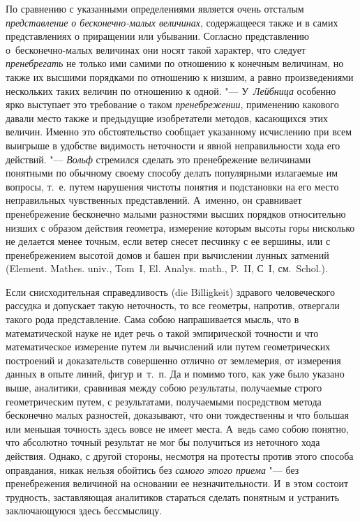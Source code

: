 По сравнению с указанными определениями является очень отсталым
{\em представление о бесконечно-малых величинах}, содержащееся также и в самих
представлениях о приращении или убывании. Согласно представлению
о~бесконечно-малых величинах они носят такой характер, что следует
{\em пренебрегать} не только ими самими по отношению к конечным величинам, но
также их высшими порядками по отношению к низшим, а равно произведениями
нескольких таких величин по отношению к одной. "--- У~{\em Лейбница} особенно
ярко выступает это требование о таком {\em пренебрежении}, применению какового
давали место также и предыдущие изобретатели методов, касающихся этих величин.
Именно это обстоятельство сообщает указанному исчислению при всем выигрыше в
удобстве видимость неточности и явной неправильности хода его действий. "---
{\em Вольф} стремился сделать это пренебрежение величинами понятными по
обычному своему способу делать популярными излагаемые им вопросы, т.~е. путем
нарушения чистоты понятия и подстановки на его место неправильных чувственных
представлений. А~именно, он сравнивает пренебрежение бесконечно малыми
разностями высших порядков относительно низших с образом действия геометра,
измерение которым высоты горы нисколько не делается менее точным, если ветер
снесет песчинку с ее вершины, или с пренебрежением высотой домов и башен при
вычислении лунных затмений (Ele\-ment. Mathes. univ., Tom~I, El. Ana\-lys.
math., P.~II, С~I, см.~Schol.).

Если снисходительная справедливость (die Billigkeit) здравого человеческого
рассудка и допускает такую неточность, то все геометры, напротив, отвергали
такого рода представление. Сама собою напрашивается мысль, что в математической
науке не идет речь о такой эмпирической точности и что математическое измерение
путем ли вычислений или путем геометрических построений и доказательств
совершенно отлично от землемерия, от измерения данных в опыте линий, фигур
и~т.~п. Да и помимо того, как уже было указано выше, аналитики, сравнивая между
собою результаты, получаемые строго геометрическим путем, с результатами,
получаемыми посредством метода бесконечно малых разностей, доказывают, что они
тождественны и что большая или меньшая точность здесь вовсе не имеет места.
А~ведь само собою понятно, что абсолютно точный результат не мог бы получиться
из неточного хода действия. Однако, с другой стороны, несмотря на протесты
против этого способа оправдания, никак нельзя обойтись без
{\em самого этого приема} "--- без пренебрежения величиной на основании ее
незначительности. И~в этом состоит трудность, заставляющая аналитиков стараться
сделать понятным и устранить заключающуюся здесь бессмыслицу.

